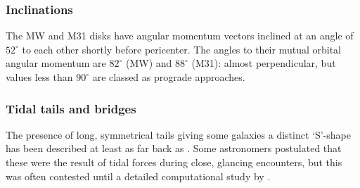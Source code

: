 \documentclass[twocolumn]{aastex63}
\begin{document}
\subsubsection{Inclinations}

The MW and M31 disks have angular momentum vectors inclined at an angle of $52^\circ$ to each other shortly before pericenter. The angles to their mutual orbital angular momentum are $82^\circ$ (MW) and $88^\circ$ (M31): almost perpendicular, but values less than $90^\circ$ are classed as prograde approaches.

\subsubsection{Tidal tails and bridges}


The presence of long, symmetrical tails giving some galaxies a distinct `S'-shape has been described at least as far back as \citet{zwicky_novel_1955}. Some astronomers postulated that these were the result of tidal forces during close, glancing encounters, but this was often contested until a detailed computational study by \citet{toomre_galactic_1972}.
\end{document}

